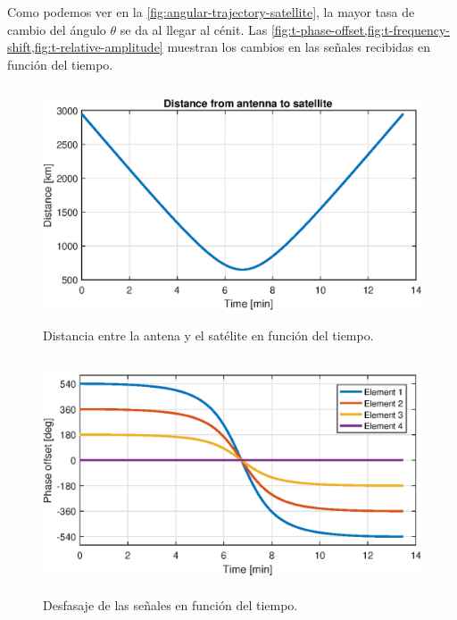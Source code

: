\documentclass{article}
\newenvironment{standalone}{\begin{preview}}{\end{preview}}
\begin{document}
\begin{standalone}
  Como podemos ver en la \cref{fig:angular-trajectory-satellite}, la mayor tasa de cambio del ángulo $\theta$ se da al llegar al cénit.
  Las \cref{fig:t-phase-offset,fig:t-frequency-shift,fig:t-relative-amplitude} muestran los cambios en las señales recibidas en función del tiempo.

  \begin{figure}[!htbp]
    \centering
    \includegraphics[width=\linewidth, height=70mm, keepaspectratio]{../images/t-distance-antenna-satellite.eps}
    \caption{Distancia entre la antena y el satélite en función del tiempo.}
    \label{fig:t-distance-antenna-satellite}
  \end{figure}

  \begin{figure}[!htbp]
    \centering
    \includegraphics[width=\linewidth, height=70mm, keepaspectratio]{../images/t-phase-offset.eps}
    \caption{Desfasaje de las señales en función del tiempo.}
    \label{fig:t-phase-offset}
  \end{figure}


\end{standalone}
\end{document}
